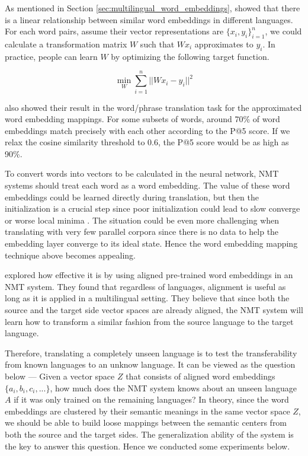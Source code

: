 \documentclass[thesis,fonts=libertine]{cluu}
\begin{document}
As mentioned in Section \ref{sec:multilingual_word_embeddings}, \textcite{Mikolov:2013ac} showed that there is a linear relationship between similar word embeddings in different languages. For each word pairs, assume their vector representations are $\{x_i, y_i\}_{i=1}^n$, we could calculate a transformation matrix $W$ such that $Wx_i$ approximates to $y_i$. In practice, people can learn $W$ by optimizing the following target function.

\begin{equation*}
  \min_W\sum_{i=1}^n||Wx_i-y_i||^2
\end{equation*}

\textcite{Mikolov:2013ac} also showed their result in the word/phrase translation task for the approximated word embedding mappings. For some subsets of words, around 70\% of word embeddings match precisely with each other according to the P@5 score. If we relax the cosine similarity threshold to 0.6, the P@5 score would be as high as 90\%.

To convert words into vectors to be calculated in the neural network, NMT systems should treat each word as a word embedding. The value of these word embeddings could be learned directly during translation, but then the initialization is a crucial step since poor initialization could lead to slow converge or worse local minima \parencite{glorot2010understanding}. The situation could be even more challenging when translating with very few parallel corpora since there is no data to help the embedding layer converge to its ideal state. Hence the word embedding mapping technique above becomes appealing.

\textcite{Qi:2018aa} explored how effective it is by using aligned pre-trained word embeddings in an NMT system. They found that regardless of languages, alignment is useful as long as it is applied in a multilingual setting. They believe that since both the source and the target side vector spaces are already aligned, the NMT system will learn how to transform a similar fashion from the source language to the target language.

Therefore, translating a completely unseen language is to test the transferability from known languages to an unknow language. It can be viewed as the question below --- Given a vector space $Z$ that consists of aligned word embeddings $\{a_i, b_i, c_i, ...\}$, how much does the NMT system knows about an unseen language $A$ if it was only trained on the remaining languages? In theory, since the word embeddings are clustered by their semantic meanings in the same vector space $Z$, we should be able to build loose mappings between the semantic centers from both the source and the target sides. The generalization ability of the system is the key to answer this question. Hence we conducted some experiments below.
\end{document}
